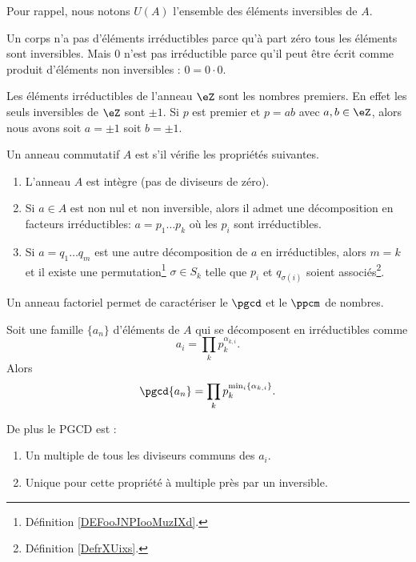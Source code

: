 Pour rappel, nous notons \( U(A)\) l'ensemble des éléments inversibles de \( A\).

\begin{example}
    Un corps n'a pas d'éléments irréductibles parce qu'à part zéro tous les éléments sont inversibles. Mais \( 0\) n'est pas irréductible parce qu'il peut être écrit comme produit d'éléments non inversibles : \( 0=0\cdot 0\).
\end{example}

\begin{example}
    Les éléments irréductibles de l'anneau \( \eZ\) sont les nombres premiers. En effet les seuls inversibles de \( \eZ\) sont \( \pm 1\). Si \( p\) est premier et \( p=ab\) avec \( a,b\in \eZ\), alors nous avons soit \( a=\pm 1\) soit \( b=\pm 1\).
\end{example}

\begin{definition}        \label{DEFooVCATooPJGWKq}
    Un anneau commutatif \( A\) est  s'il vérifie les propriétés suivantes.
    \begin{enumerate}
        \item
            L'anneau \( A\) est intègre (pas de diviseurs de zéro).
        \item
            Si \( a\in A\) est non nul et non inversible, alors il admet une décomposition en facteurs irréductibles: \( a=p_1\ldots p_k\) où les \( p_i\) sont irréductibles.
        \item
            Si \( a=q_1\ldots q_m\) est une autre décomposition de \( a\) en irréductibles, alors \( m=k\) et il existe une permutation\footnote{Définition \ref{DEFooJNPIooMuzIXd}.} \( \sigma\in S_k\) telle que \( p_i\) et \( q_{\sigma(i)}\) soient associés\footnote{Définition \ref{DefrXUixs}.}.
    \end{enumerate}
\end{definition}

Un anneau factoriel permet de caractériser le \( \pgcd\) et le \( \ppcm\) de nombres.

\begin{proposition}
Soit une famille \( \{ a_n \}\) d'éléments de \( A\) qui se décomposent en irréductibles comme
\begin{equation}
    a_i=\prod_k p_k^{\alpha_{k,i}}.
\end{equation}
Alors
\begin{equation}
    \pgcd\{ a_n \}=\prod_k p_k^{\min_i\{ \alpha_{k,i} \}}.
\end{equation}

De plus le PGCD est :
\begin{enumerate}
    \item
        Un multiple de tous les diviseurs communs des \( a_i\).
    \item
        Unique pour cette propriété à multiple près par un inversible.
\end{enumerate}

\end{proposition}

